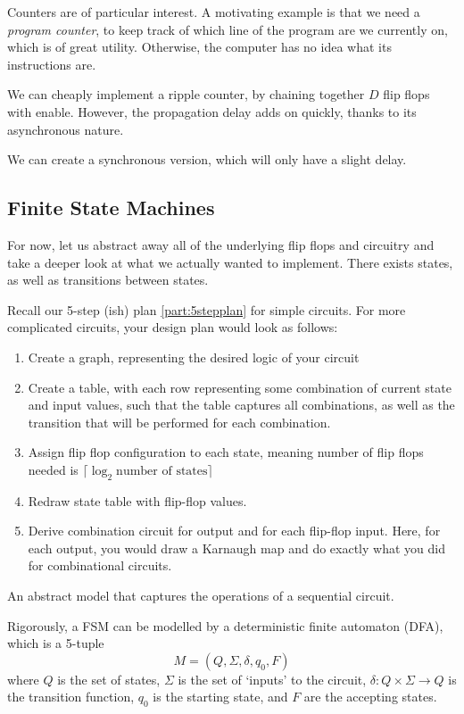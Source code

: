 Counters are of particular interest. A motivating example is that we need a \textit{program counter}, to keep track of which line of the program are we currently on, which is of great utility. Otherwise, the computer has no idea what its instructions are.

We can cheaply implement a ripple counter, by chaining together $D$ flip flops with enable. However, the propagation delay adds on quickly, thanks to its asynchronous nature. 

We can create a synchronous version, which will only have a slight delay.

\subsection{Finite State Machines}

For now, let us abstract away all of the underlying flip flops and circuitry and take a deeper look at what we actually wanted to implement. There exists states, as well as transitions between states. 

Recall our 5-step (ish) plan \ref{part:5stepplan} for simple circuits. For more complicated circuits, your design plan would look as follows:
\begin{enumerate}
\item Create a graph, representing the desired logic of your circuit
\item Create a table, with each row representing some combination of current state and input values, such that the table captures all combinations, as well as the transition that will be performed for each combination.
\item Assign flip flop configuration to each state, meaning number of flip flops needed is $\lceil \log_2 \text{number of states} \rceil $
\item Redraw state table with flip-flop values.
\item Derive combination circuit for output and for each flip-flop input. Here, for each output, you would draw a Karnaugh map and do exactly what you did for combinational circuits.
\end{enumerate}

\begin{definition}
An abstract model that captures the operations of a sequential circuit.
\end{definition}

\noindent Rigorously, a FSM can be modelled by a deterministic finite automaton (DFA), which is a 5-tuple
\[
M = (Q, \Sigma, \delta, q_0, F)
\]
where $Q$ is the set of states, $\Sigma$ is the set of `inputs' to the circuit, $\delta : Q \times \Sigma \to Q$ is the transition function, $q_0$ is the starting state, and $F$ are the accepting states. 

